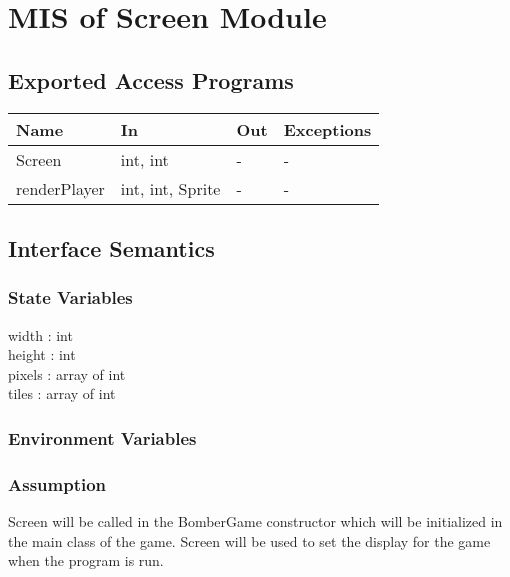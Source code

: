 \documentclass[12pt, letterpaper]{article}
\begin{document}
	\section{MIS of Screen Module}
	
	\subsection{Exported Access Programs}
	
		\begin{center}
			\begin{tabular}{ p{4cm} p{3cm} p{3cm} p{4cm} }
				\hline
				\textbf{Name} & \textbf{In} & \textbf{Out} & \textbf{Exceptions}\\ 
				\hline
				Screen & int, int & - & -  \\
				renderPlayer & int, int, Sprite & - & -  \\ 
				\hline  
				
			\end{tabular}				
		\end{center}
	
	\subsection{Interface Semantics}
	
	\subsubsection{State Variables}
	
	width : int \\
	height : int \\
	pixels : array of int \\
	tiles : array of int \\
	
	
	\subsubsection{Environment Variables}
	
	\subsubsection{Assumption}
	
	\indent \indent Screen will be called in the BomberGame constructor which will be initialized in the main class of the game. Screen will be used to set the display for the game when the program is run.
	
\end{document}
